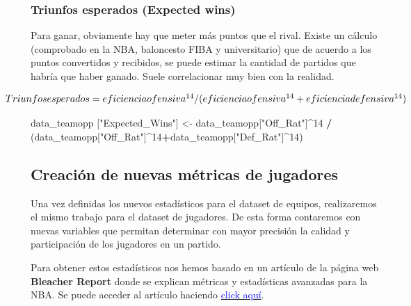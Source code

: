 \documentclass[
]{article}
\newenvironment{Shaded}{\begin{snugshade}}{\end{snugshade}}
\newcommand{\DecValTok}[1]{\textcolor[rgb]{0.00,0.00,0.81}{#1}}
\newcommand{\NormalTok}[1]{#1}
\newcommand{\OperatorTok}[1]{\textcolor[rgb]{0.81,0.36,0.00}{\textbf{#1}}}
\newcommand{\StringTok}[1]{\textcolor[rgb]{0.31,0.60,0.02}{#1}}
\begin{document}
\hypertarget{triunfos-esperados-expected-wins}{%
\subsubsection{Triunfos esperados (Expected
wins)}\label{triunfos-esperados-expected-wins}}

Para ganar, obviamente hay que meter más puntos que el rival. Existe un
cálculo (comprobado en la NBA, baloncesto FIBA y universitario) que de
acuerdo a los puntos convertidos y recibidos, se puede estimar la
cantidad de partidos que habría que haber ganado. Suele correlacionar
muy bien con la realidad.

\[
  \makebox[\linewidth]{$Triunfos esperados = eficiencia ofensiva^{14}/(eficiencia ofensiva^{14}+eficiencia defensiva^{14})$}
\]

\begin{Shaded}
\begin{Highlighting}[]
\NormalTok{data_teamopp [}\StringTok{"Expected_Wins"}\NormalTok{] <-}\StringTok{ }\NormalTok{data_teamopp[}\StringTok{"Off_Rat"}\NormalTok{]}\OperatorTok{^}\DecValTok{14} \OperatorTok{/}
\StringTok{  }\NormalTok{(data_teamopp[}\StringTok{"Off_Rat"}\NormalTok{]}\OperatorTok{^}\DecValTok{14}\OperatorTok{+}\NormalTok{data_teamopp[}\StringTok{"Def_Rat"}\NormalTok{]}\OperatorTok{^}\DecValTok{14}\NormalTok{)}
\end{Highlighting}
\end{Shaded}

\newpage

\hypertarget{creaciuxf3n-de-nuevas-muxe9tricas-de-jugadores}{%
\subsection{Creación de nuevas métricas de
jugadores}\label{creaciuxf3n-de-nuevas-muxe9tricas-de-jugadores}}

Una vez definidas los nuevos estadísticos para el dataset de equipos,
realizaremos el mismo trabajo para el dataset de jugadores. De esta
forma contaremos con nuevas variables que permitan determinar con mayor
precisión la calidad y participación de los jugadores en un partido.

Para obtener estos estadísticos nos hemos basado en un artículo de la
página web \textbf{Bleacher Report} donde se explican métricas y
estadísticas avanzadas para la NBA. Se puede acceder al artículo
haciendo
\href{https://bleacherreport.com/articles/1039116-understanding-the-nba-explaining-advanced-offensive-stats-and-metrics}{\textcolor{blue}{click aquí}}.
\end{document}
